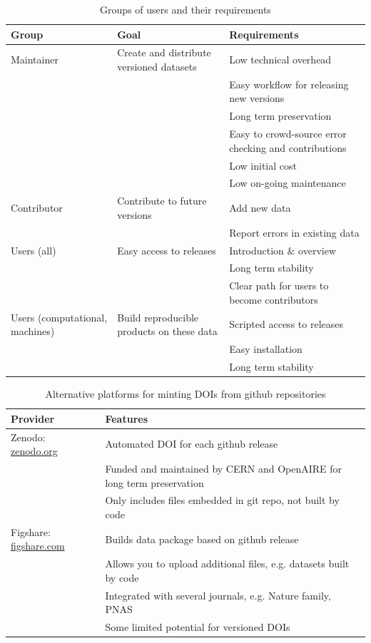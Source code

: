 \documentclass[a4paper,11pt]{article}
\newcommand{\smurl}[1]{{\footnotesize\url{#1}}}
\begin{document}
\begin{table}[h!]
\centering
\caption{Groups of users and their requirements}
{\footnotesize
\vspace{1cm}
  \begin{tabular}{p{2cm}p{5cm}p{7cm}}
  \hline
  \textbf{Group} & \textbf{Goal} & \textbf{Requirements} \\ \hline
  Maintainer & Create and distribute versioned datasets & Low technical overhead \\
    & & Easy workflow for releasing new versions \\
    & & Long term preservation \\
    & & Easy to crowd-source error checking and contributions \\
    & & Low initial cost \\
    & & Low on-going maintenance \\
  Contributor & Contribute to future versions & Add new data \\
    & & Report errors in existing data  \\
  Users (all) & Easy access to releases & Introduction \& overview \\
    & & Long term stability \\
    & & Clear path for users to become contributors \\
  Users (computational, machines) & Build reproducible products on these data & Scripted access to releases\\
    & &Easy installation\\
    & & Long term stability \\
  \hline
  \end{tabular}
  }
\label{tab:user_requirements}
\end{table}

\newpage


\begin{table}[h!]
\centering
\caption{Alternative platforms for minting DOIs from github repositories}
{\footnotesize
\vspace{1cm}
  \begin{tabular}{p{4cm}p{8cm}}
  \hline
  \textbf{Provider} & \textbf{Features} \\ \hline
  Zenodo: \smurl{zenodo.org} & Automated DOI for each github release \\
    & Funded and maintained by CERN and OpenAIRE for long term preservation \\
    & Only includes files embedded in git repo, not built  by code\\
  Figshare: \smurl{figshare.com} & Builds data package based on github release \\
    & Allows you to upload additional files, e.g. datasets built by code \\
    & Integrated with several journals, e.g. Nature family, PNAS \\
    & Some limited potential for versioned DOIs\\
  \hline
  \end{tabular}
  }
\label{tab:doi_minting}
\end{table}
\end{document}
